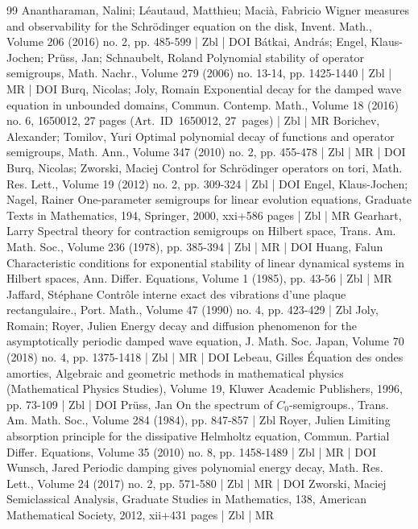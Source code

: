 \documentclass[10pt]{amsart}
\theoremstyle{definition}\newtheorem{defi}[theo]{Definition}\newtheorem{rema}[theo]{Remark}\newtheorem{exam}[theo]{Example}\newtheorem{exem}[theo]{Example}\newtheorem{nota}[theo]{Notation}
\newcommand{\1}{\mathds 1}
\begin{document}
\begin{thebibliography}{99}
Anantharaman, Nalini; Léautaud, Matthieu; Macià, Fabricio Wigner measures and observability for the Schrödinger equation on the disk, Invent. Math., Volume 206 (2016) no. 2, pp. 485-599 | Zbl | DOI
Bátkai, András; Engel, Klaus-Jochen; Prüss, Jan; Schnaubelt, Roland Polynomial stability of operator semigroups, Math. Nachr., Volume 279 (2006) no. 13-14, pp. 1425-1440 | Zbl | MR | DOI
Burq, Nicolas; Joly, Romain Exponential decay for the damped wave equation in unbounded domains, Commun. Contemp. Math., Volume 18 (2016) no. 6, 1650012, 27 pages (Art. ID 1650012, 27 pages) | Zbl | MR
Borichev, Alexander; Tomilov, Yuri Optimal polynomial decay of functions and operator semigroups, Math. Ann., Volume 347 (2010) no. 2, pp. 455-478 | Zbl | MR | DOI
Burq, Nicolas; Zworski, Maciej Control for Schrödinger operators on tori, Math. Res. Lett., Volume 19 (2012) no. 2, pp. 309-324 | Zbl | DOI
Engel, Klaus-Jochen; Nagel, Rainer One-parameter semigroups for linear evolution equations, Graduate Texts in Mathematics, 194, Springer, 2000, xxi+586 pages | Zbl | MR
Gearhart, Larry Spectral theory for contraction semigroups on Hilbert space, Trans. Am. Math. Soc., Volume 236 (1978), pp. 385-394 | Zbl | MR | DOI
Huang, Falun Characteristic conditions for exponential stability of linear dynamical systems in Hilbert spaces, Ann. Differ. Equations, Volume 1 (1985), pp. 43-56 | Zbl | MR
Jaffard, Stéphane Contrôle interne exact des vibrations d’une plaque rectangulaire., Port. Math., Volume 47 (1990) no. 4, pp. 423-429 | Zbl
Joly, Romain; Royer, Julien Energy decay and diffusion phenomenon for the asymptotically periodic damped wave equation, J. Math. Soc. Japan, Volume 70 (2018) no. 4, pp. 1375-1418 | Zbl | MR | DOI
Lebeau, Gilles Équation des ondes amorties, Algebraic and geometric methods in mathematical physics (Mathematical Physics Studies), Volume 19, Kluwer Academic Publishers, 1996, pp. 73-109 | Zbl | DOI
Prüss, Jan On the spectrum of ${C}_0$-semigroups., Trans. Am. Math. Soc., Volume 284 (1984), pp. 847-857 | Zbl
Royer, Julien Limiting absorption principle for the dissipative Helmholtz equation, Commun. Partial Differ. Equations, Volume 35 (2010) no. 8, pp. 1458-1489 | Zbl | MR | DOI
Wunsch, Jared Periodic damping gives polynomial energy decay, Math. Res. Lett., Volume 24 (2017) no. 2, pp. 571-580 | Zbl | MR | DOI
Zworski, Maciej Semiclassical Analysis, Graduate Studies in Mathematics, 138, American Mathematical Society, 2012, xii+431 pages | Zbl | MR
\end{thebibliography}
\end{document}
